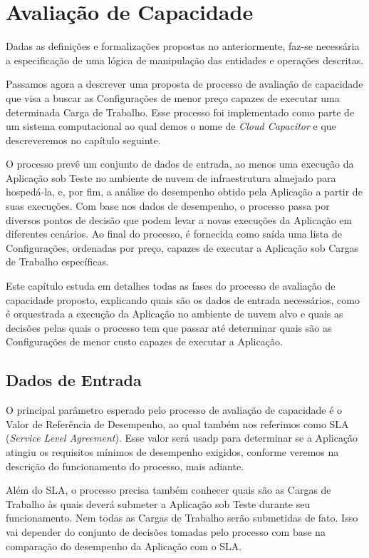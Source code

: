 \chapter[Avaliação de Capacidade]{Avaliação de Capacidade}
Dadas as definições e formalizações propostas no anteriormente, faz-se necessária
a especificação de uma lógica de manipulação das entidades e operações descritas.

Passamos agora a descrever uma proposta de processo de avaliação de capacidade
que visa a buscar as Configurações de menor preço capazes de executar uma determinada 
Carga de Trabalho. Esse processo foi implementado como parte de um sistema 
computacional ao qual demos o nome de \emph{Cloud Capacitor} e que descreveremos 
no capítulo seguinte.  

O processo prevê um conjunto de dados de entrada, ao menos uma execução da 
Aplicação sob Teste no ambiente de nuvem de infraestrutura almejado para 
hospedá-la, e, por fim, a análise do desempenho obtido pela Aplicação a partir 
de suas execuções. Com base nos dados de desempenho, o processo passa por diversos
pontos de decisão que podem levar a novas execuções da Aplicação em diferentes 
cenários. Ao final do processo, é fornecida como saída uma lista de Configurações, 
ordenadas por preço, capazes de executar a Aplicação sob Cargas de Trabalho específicas.

Este capítulo estuda em detalhes todas as fases do processo de avaliação de capacidade
proposto, explicando quais são os dados de entrada necessários, como é orquestrada
a execução da Aplicação no ambiente de nuvem alvo e quais as decisões pelas quais
o processo tem que passar até determinar quais são as Configurações de menor custo
capazes de executar a Aplicação.

\section{Dados de Entrada}

O principal parâmetro esperado pelo processo de avaliação de capacidade é o Valor
de Referência de Desempenho, ao qual também nos referimos como SLA 
(\emph{Service Level Agreement}). Esse valor será usadp para determinar 
se a Aplicação atingiu os requisitos mínimos de desempenho exigidos, conforme
veremos na descrição do funcionamento do processo, mais adiante.

Além do SLA, o processo precisa também conhecer quais são as Cargas de Trabalho
às quais deverá submeter a Aplicação sob Teste durante seu funcionamento. Nem todas
as Cargas de Trabalho serão submetidas de fato. Isso vai depender do conjunto de
decisões tomadas pelo processo com base na comparação do desempenho da Aplicação
com o SLA.


